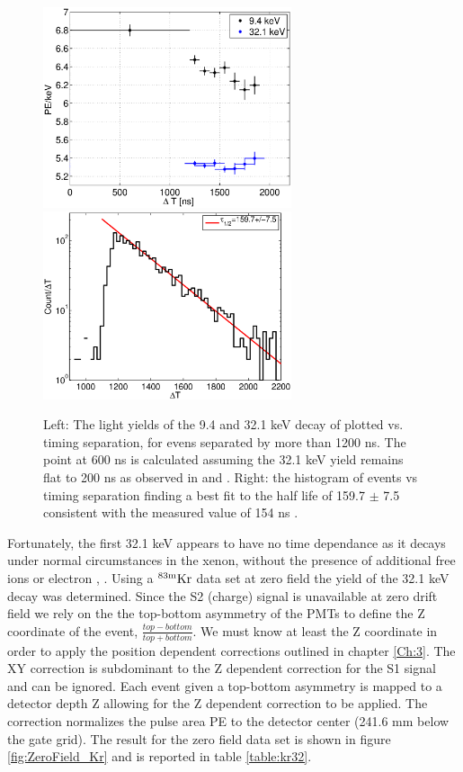  \begin{figure}[h!]\centering
\includegraphics[width=73mm]{Chapter_Flucs/Figures/Kr/dT_lux10_20130510T1250_cp09323} %
\includegraphics[width=73mm]{Chapter_Flucs/Figures/Kr/dT_fit_lux10_20130510T1250}
\caption{Left: The light yields of the 9.4 and 32.1 keV decay of \KrCal plotted vs. timing separation, for evens separated by more than 1200 ns. The point at 600 ns is calculated assuming the 32.1 keV yield remains flat to 200 ns as observed in \cite{Kastens} and \cite{Baudis} . Right: the histogram of \KrCal events vs timing separation finding a best fit to the half life of 159.7 $\pm$ 7.5 consistent with the measured value of 154 ns \cite{83Kr_HalfLife_1} \cite{83Kr_HalfLife_2}. }
\label{fig:Yield_Kr9}
\end{figure}

Fortunately, the first 32.1 keV appears to have no time dependance as it decays under normal circumstances in the xenon, without the presence of additional free ions or electron \cite{Baudis}, \cite{Aprile_LY}. Using a $\rm^{83m}Kr$ data set at zero field the yield of the 32.1 keV decay was determined. Since the S2 (charge) signal is unavailable at zero drift field we rely on the the top-bottom asymmetry of the PMTs to define the Z coordinate of the event, $\frac{top-bottom}{top+bottom} $. We must know at least the Z coordinate in order to apply the position dependent corrections outlined in chapter \ref{Ch:3}. The XY correction is subdominant to the Z dependent correction for the S1 signal and can be ignored. Each event given a top-bottom asymmetry is mapped to a detector depth Z allowing for the Z dependent correction to be applied. The correction normalizes the pulse area PE to the detector center (241.6 mm below the gate grid). The result for the zero field data set is shown in figure \ref{fig:ZeroField_Kr} and is reported in table \ref{table:kr32}.
 
